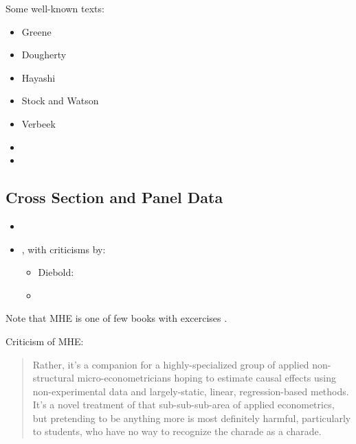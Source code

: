 \documentclass[letterpaper,10pt,english]{sphinxmanual}
\begin{document}
Some well-known texts:
\begin{itemize}
\item {} 
Greene

\item {} 
Dougherty

\item {} 
Hayashi

\item {} 
Stock and Watson

\item {} 
Verbeek

\item {} 

\item {} 

\end{itemize}


\subsection{Cross Section and Panel Data}
\label{\detokenize{textbook/econometrics:cross-section-and-panel-data}}\begin{itemize}
\item {} 

\item {} 
, with criticisms by:
\begin{itemize}
\item {} 
Diebold: 

\item {} 

\end{itemize}

\end{itemize}

Note that MHE is one of few books with excercises .

Criticism of MHE:
\begin{quote}

Rather, it’s a companion for a highly-specialized group of applied non-structural micro-econometricians hoping to estimate causal effects using non-experimental data and largely-static, linear, regression-based methods. It’s a novel treatment of that sub-sub-sub-area of applied econometrics, but pretending to be anything more is most definitely harmful, particularly to students, who have no way to recognize the charade as a charade.
\end{quote}
\end{document}
